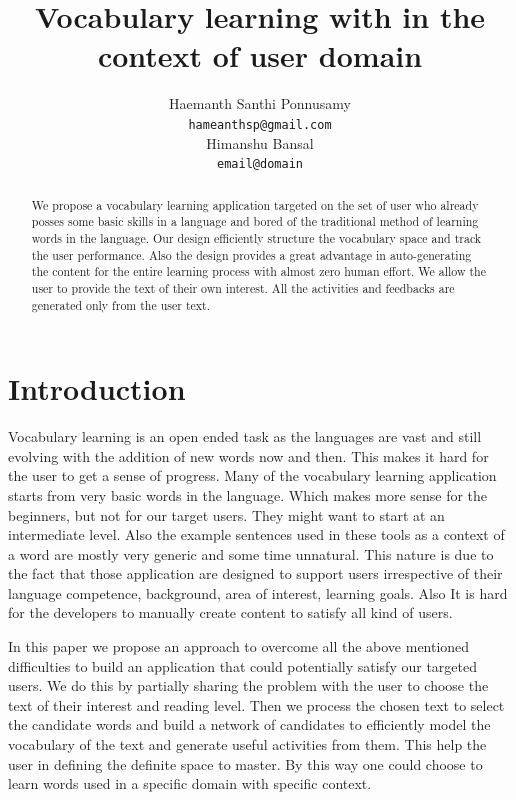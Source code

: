 \documentclass[11pt,a4paper]{article}
\title{Vocabulary learning with in the context of user domain}
\author{Haemanth Santhi Ponnusamy \\
  {\tt hameanthsp@gmail.com} \\\And
  Himanshu Bansal \\
  {\tt email@domain}}
\date{}
\begin{document}
\maketitle
\begin{abstract}
  We propose a vocabulary learning application targeted on the set of user
  who already posses some basic skills in a language and bored of the
  traditional method of learning words in the language. Our design 
  efficiently structure the vocabulary space and track the user performance.
  Also the design provides a great advantage in auto-generating the content
  for the entire learning process with almost zero human effort. We allow the
  user to provide the text of their own interest. All the activities and
  feedbacks are generated only from the user text.

\end{abstract}

\section{Introduction}
Vocabulary learning is an open ended task as the languages are vast and still
evolving with the addition of new words now and then. This makes it hard for the
user to get a sense of progress. Many of the vocabulary learning application 
starts from very basic words in the language. Which makes more sense for the 
beginners, but not for our target users. They might want to start at an
intermediate level. Also the example sentences used in these tools as a context
of a word are mostly very generic and some time unnatural. This nature is due to the
fact that those application are designed to support users irrespective of their
language competence, background, area of interest, learning goals. Also It is
hard for the developers to manually create content to satisfy all kind of users.

In this paper we propose an approach to overcome all the above mentioned
difficulties to build an application that could potentially satisfy our targeted
users. We do this by partially sharing the problem with the user to choose the 
text of their interest and reading level. Then we process the chosen text to
select the candidate words and build a network of candidates to efficiently model
the vocabulary of the text and generate useful activities from them. This help
the user in defining the definite space to master. By this way one
could choose to learn words used in a specific domain with specific context.
\end{document}
